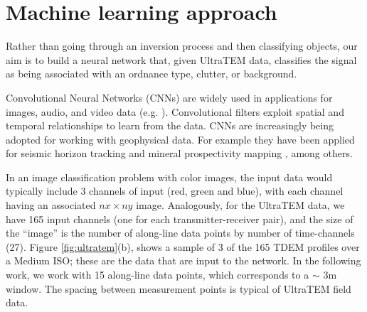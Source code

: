 \documentclass{segabs}
\begin{document}
\vspace{-0.45cm}
\section{Machine learning approach}
\vspace{-0.25cm}

Rather than going through an inversion process and then classifying objects, our aim is to build a neural network that, given UltraTEM data, classifies the signal as being associated with an ordnance type, clutter, or background.

Convolutional Neural Networks (CNNs) are widely used in applications for images, audio, and video data (e.g. \cite{Krizhevsky2012, LeCun1995, LeCun2010}). Convolutional filters exploit spatial and temporal relationships to learn from the data. CNNs are increasingly being adopted for working with geophysical data. For example they have been applied for seismic horizon tracking \citep{Peters2020} and mineral prospectivity mapping \citep{Granek2016}, among others.

In an image classification problem with color images, the input data would typically include 3 channels of input (red, green and blue), with each channel having an associated $nx \times ny$ image. Analogously, for the UltraTEM data, we have 165 input channels (one for each transmitter-receiver pair), and the size of the ``image'' is the number of along-line data points by number of time-channels (27). Figure \ref{fig:ultratem}(b), shows a sample of 3 of the 165 TDEM profiles over a Medium ISO; these are the data that are input to the network. In the following work, we work with 15 along-line data points, which corresponds to a $\sim$ 3m window. The spacing between measurement points is typical of UltraTEM field data.
\end{document}
